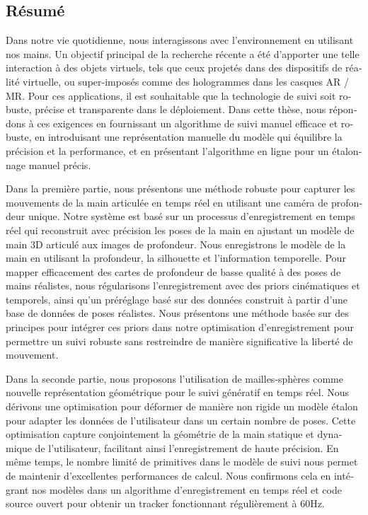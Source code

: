 \begin{otherlanguage}{french}
\cleardoublepage
\chapter*{Résumé}

Dans notre vie quotidienne, nous interagissons avec l'environnement en utilisant nos mains. Un objectif principal de la recherche récente a été d'apporter une telle interaction à des objets virtuels, tels que ceux projetés dans des dispositifs de réalité virtuelle, ou super-imposés comme des hologrammes dans les casques AR / MR. Pour ces applications, il est souhaitable que la technologie de suivi soit robuste, précise et transparente dans le déploiement. Dans cette thèse, nous répondons à ces exigences en fournissant un algorithme de suivi manuel efficace et robuste, en introduisant une représentation manuelle du modèle qui équilibre la précision et la performance, et en présentant l'algorithme en ligne pour un étalonnage manuel précis.

Dans la première partie, nous présentons une méthode robuste pour capturer les mouvements de la main articulée en temps réel en utilisant une caméra de profondeur unique. Notre système est basé sur un processus d'enregistrement en temps réel qui reconstruit avec précision les poses de la main en ajustant un modèle de main 3D articulé aux images de profondeur. Nous enregistrons le modèle de la main en utilisant la profondeur, la silhouette et l'information temporelle. Pour mapper efficacement des cartes de profondeur de basse qualité à des poses de mains réalistes, nous régularisons l'enregistrement avec des priors cinématiques et temporels, ainsi qu'un préréglage basé sur des données construit à partir d'une base de données de poses réalistes. Nous présentons une méthode basée sur des principes pour intégrer ces priors dans notre optimisation d'enregistrement pour permettre un suivi robuste sans restreindre de manière significative la liberté de mouvement.

Dans la seconde partie, nous proposons l'utilisation de mailles-sphères comme nouvelle représentation géométrique pour le suivi génératif en temps réel. Nous dérivons une optimisation pour déformer de manière non rigide un modèle étalon pour adapter les données de l'utilisateur dans un certain nombre de poses. Cette optimisation capture conjointement la géométrie de la main statique et dynamique de l'utilisateur, facilitant ainsi l'enregistrement de haute précision. En même temps, le nombre limité de primitives dans le modèle de suivi nous permet de maintenir d'excellentes performances de calcul. Nous confirmons cela en intégrant nos modèles dans un algorithme d'enregistrement en temps réel et code source ouvert pour obtenir un tracker fonctionnant régulièrement à 60Hz.


\end{otherlanguage}
